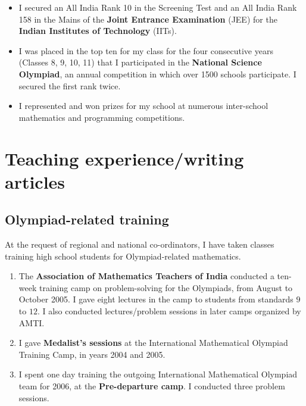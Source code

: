 \documentclass[12pt,a4paper,oneside]{amsart}
\begin{document}
\begin{itemize}

\item I secured an All India Rank 10 in the Screening Test and 
  an All India Rank 158 in the Mains of the {\bf Joint Entrance
  Examination} (JEE) for the {\bf Indian Institutes of Technology} (IITs).

\item I was placed in the top ten for my class for the four
  consecutive years (Classes 8, 9, 10, 11) that I participated in the
  {\bf National Science Olympiad}, an annual competition in which over
  1500 schools participate. I secured the first rank twice.

\item I represented and won prizes for my school at numerous
  inter-school mathematics and programming competitions.

\end{itemize}

\section{Teaching experience/writing articles}

\subsection{Olympiad-related training}

At the request of regional and national co-ordinators, I have taken classes
training high school students for Olympiad-related mathematics.

\begin{enumerate}

\item The {\bf Association of Mathematics Teachers of India} conducted
  a ten-week training camp on problem-solving for the Olympiads, from
  August to October 2005.  I gave eight lectures in the camp to
  students from standards $9$ to $12$. I also conducted lectures/problem
  sessions in later camps organized by AMTI.

\item I gave {\bf Medalist's sessions} at the International Mathematical
  Olympiad Training Camp, in years 2004 and 2005.

\item I spent one day training the outgoing International Mathematical
  Olympiad team for 2006, at the {\bf Pre-departure camp}. I conducted
  three problem sessions.

\end{enumerate}
\end{document}

